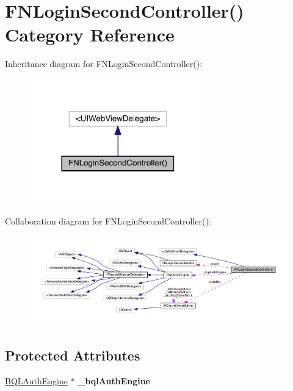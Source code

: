 \hypertarget{category_f_n_login_second_controller_07_08}{}\section{F\+N\+Login\+Second\+Controller() Category Reference}
\label{category_f_n_login_second_controller_07_08}


Inheritance diagram for F\+N\+Login\+Second\+Controller()\+:\nopagebreak
\begin{figure}[H]
\begin{center}
\leavevmode
\includegraphics[width=218pt]{category_f_n_login_second_controller_07_08__inherit__graph}
\end{center}
\end{figure}


Collaboration diagram for F\+N\+Login\+Second\+Controller()\+:\nopagebreak
\begin{figure}[H]
\begin{center}
\leavevmode
\includegraphics[width=350pt]{category_f_n_login_second_controller_07_08__coll__graph}
\end{center}
\end{figure}
\subsection*{Protected Attributes}
\begin{DoxyCompactItemize}
\item 
\mbox{\label{category_f_n_login_second_controller_07_08_a30d61d6d7b5298143258e89e8ea8561e}} 
\mbox{\hyperlink{interface_b_q_l_auth_engine}{B\+Q\+L\+Auth\+Engine}} $\ast$ {\bfseries \+\_\+bql\+Auth\+Engine}
\end{DoxyCompactItemize}
